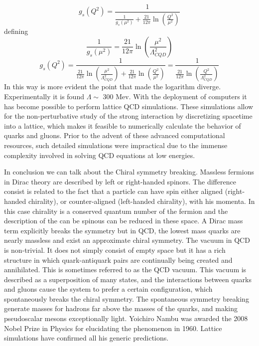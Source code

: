 \documentclass[12pt,a4paper]{book}
\begin{document}
	\begin{equation}
		g_s(Q^2)= \frac{1}{\frac{1}{g_s(\mu^2)}+ \frac{21}{12\pi} \ln\left(\frac{Q^2}{\mu^2}\right)}
		\label{eq:running_QCD2}
	\end{equation} 
	defining 
	\begin{equation}
		\frac{1}{g_s(\mu^2)}= \frac{21}{12\pi} \ln\left(\frac{\mu^2}{\Lambda_{CQD}^2}\right)
	\end{equation} 
	\begin{equation}
		g_s(Q^2)=  \frac{1}{\frac{21}{12\pi} \ln\left(\frac{\mu^2}{\Lambda_{CQD}^2}\right)+ \frac{21}{12\pi} \ln\left(\frac{Q^2}{\mu^2}\right) }
		=\frac{1}{\frac{21}{12\pi} \ln \left(\frac{Q^2}{\Lambda_{CQD}^2}\right)}
		\label{eq:running_QCD_scale_factor}
	\end{equation} 
	In this way is more evident the point that made the logarithm diverge. Experimentally it is found $\Lambda \sim$ 300 Mev.\cite{Semprini} 
	With the deployment of computers it has become possible to perform lattice QCD simulations. These simulations allow for the non-perturbative study of the strong interaction by discretizing spacetime into a lattice, which makes it feasible to numerically calculate the behavior of quarks and gluons. Prior to the advent of these advanced computational resources, such detailed simulations were impractical due to the immense complexity involved in solving QCD equations at low energies.
	
	In conclusion we can talk about the Chiral symmetry breaking. Massless fermions in Dirac theory are described by left or right-handed spinors. The difference consist is related to the fact that a particle can have spin either aligned (right-handed chirality), or counter-aligned (left-handed chirality), with his momenta. In this case chirality is a conserved quantum number of the fermion and the description of the can be spinous can be reduced in these space. A Dirac mass term explicitly breaks the symmetry but in QCD, the lowest mass quarks are nearly massless and exist an approximate chiral symmetry. The vacuum in QCD is non-trivial. It does not simply consist of empty space but it has a rich structure in which quark-antiquark pairs are continually being created and annihilated. This is sometimes referred to as the QCD vacuum. This vacuum is described as a superposition of many states, and the interactions between quarks and gluons cause the system to prefer a certain configuration, which spontaneously breaks the chiral symmetry. The spontaneous symmetry breaking generate masses for hadrons far above the masses of the quarks, and making pseudoscalar mesons exceptionally light. Yoichiro Nambu was awarded the 2008 Nobel Prize in Physics for elucidating the phenomenon in 1960. Lattice simulations have confirmed all his generic predictions. 
	
\end{document}
